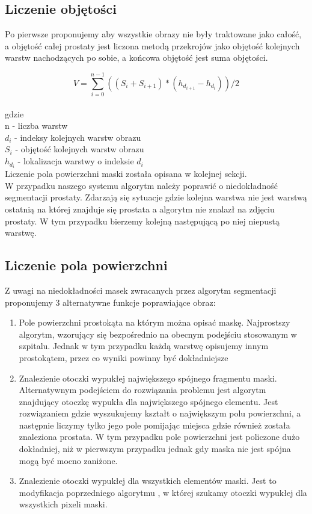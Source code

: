 \documentclass[a4paper,11pt,twoside]{report}
\theoremstyle{definition}
\begin{document}
\subsection{Liczenie objętości}

Po pierwsze proponujemy aby wszystkie obrazy nie były traktowane jako całość, a objętość całej prostaty jest liczona metodą przekrojów jako objętość kolejnych warstw nachodzących po sobie, a końcowa objętość jest suma objętości. 

\[V = \sum_{i=0}^{n-1} ((S_i + S_{i+1}) * (h_{d_{i+1}} - h_{d_i})) / 2 \]
\\
gdzie\\
n - liczba warstw \\
\(d_i\) - indeksy kolejnych warstw obrazu \\
\(S_i\) - objętość kolejnych warstw obrazu \\
\(h_{d_i}\) - lokalizacja warstwy o indeksie \(d_{i}\) \\

Liczenie pola powierzchni maski została opisana w kolejnej sekcji. \\
W przypadku naszego systemu algorytm należy poprawić o niedokładność segmentacji prostaty. Zdarzają się sytuacje gdzie kolejna warstwa nie jest warstwą ostatnią na której znajduje się prostata a algorytm nie znalazł na zdjęciu prostaty. W tym przypadku bierzemy kolejną następującą po niej niepustą warstwę.

\subsection{Liczenie pola powierzchni}
Z uwagi na niedokładności masek zwracanych przez algorytm segmentacji proponujemy 3 alternatywne funkcje poprawiające obraz:
\begin{enumerate}
\item Pole powierzchni prostokąta na którym można opisać maskę. Najprostszy algorytm, wzorujący się bezpośrednio na obecnym podejściu stosowanym w szpitalu. Jednak w tym przypadku każdą warstwę opisujemy innym prostokątem, przez co wyniki powinny być dokładniejsze
\item Znalezienie otoczki wypukłej największego spójnego fragmentu maski. Alternatywnym podejściem do rozwiązania problemu jest algorytm znajdujący otoczkę wypukła dla największego spójnego elementu. Jest rozwiązaniem gdzie wyszukujemy kształt o największym polu powierzchni, a następnie liczymy tylko jego pole pomijając miejsca gdzie również została znaleziona prostata. W tym przypadku pole powierzchni jest policzone dużo dokładniej, niż w pierwszym przypadku jednak gdy maska nie jest spójna mogą być mocno zaniżone. 
\item Znalezienie otoczki wypukłej dla wszystkich elementów maski. Jest to modyfikacja poprzedniego algorytmu , w której szukamy otoczki wypukłej dla wszystkich pixeli maski.
\end{enumerate}
\end{document}
